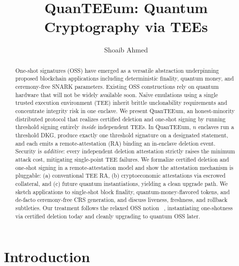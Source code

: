 \documentclass[runningheads,orivec]{llncs}
\newcommand{\prot}{\textsf{QuanTEEum}}
\begin{document}
\title{QuanTEEum: Quantum Cryptography via TEEs}
\author{Shoaib Ahmed}
\maketitle

\begin{abstract}
One-shot signatures (OSS) have emerged as a versatile abstraction underpinning proposed blockchain applications including deterministic finality, quantum money, and ceremony-free SNARK parameters. Existing OSS constructions rely on quantum hardware that will not be widely available soon. Naïve emulations using a single trusted execution environment (TEE) inherit brittle unclonability requirements and concentrate integrity risk in one enclave. We present \prot{}, an honest-minority distributed protocol that realizes certified deletion and one-shot signing by running threshold signing entirely \emph{inside} independent TEEs. In \prot{}, $n$ enclaves run a threshold DKG, produce exactly one threshold signature on a designated statement, and each emits a remote-attestation (RA) binding an in-enclave deletion event. Security is \emph{additive}: every independent deletion attestation strictly raises the minimum attack cost, mitigating single-point TEE failures. We formalize certified deletion and one-shot signing in a remote-attestation model and show the attestation mechanism is pluggable: (a) conventional TEE RA, (b) cryptoeconomic attestations via escrowed collateral, and (c) future quantum instantiations, yielding a clean upgrade path. We sketch applications to single-shot block finality, quantum-money-flavored tokens, and de-facto ceremony-free CRS generation, and discuss liveness, freshness, and rollback subtleties.
Our treatment follows the relaxed OSS notion ~\cite{pkc-2024-34093}, instantiating one-shotness via certified deletion today and cleanly upgrading to quantum OSS later.
\end{abstract}

\section{Introduction}
\end{document}
